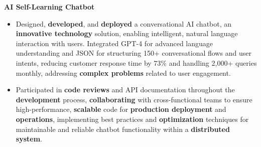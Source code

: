 \documentclass[a4paper,10pt]{article}
\begin{document}
\vspace{-2mm}
\textbf{AI Self-Learning Chatbot} \\
\begin{itemize}[leftmargin=*, itemsep=0pt, parsep=1pt]
\vspace{-7mm}
    \item Designed, \textbf{developed}, and \textbf{deployed} a conversational AI chatbot, an \textbf{innovative technology} solution, enabling intelligent, natural language interaction with users. Integrated GPT-4 for advanced language understanding and JSON for structuring 150+ conversational flows and user intents, reducing customer response time by 73\% and handling 2,000+ queries monthly, addressing \textbf{complex problems} related to user engagement.
    \item Participated in \textbf{code reviews} and API documentation throughout the \textbf{development} process, \textbf{collaborating} with cross-functional teams to ensure high-performance, \textbf{scalable} code for \textbf{production deployment} and \textbf{operations}, implementing best practices and \textbf{optimization} techniques for maintainable and reliable chatbot functionality within a \textbf{distributed system}.
\end{itemize}

\vspace{-2mm}
\end{document}
